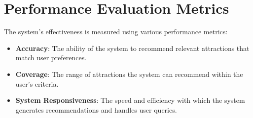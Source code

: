 \section{Performance Evaluation Metrics}
The system's effectiveness is measured using various performance metrics:
\begin{itemize}
    \item \textbf{Accuracy}: The ability of the system to recommend relevant attractions that match user preferences.
    \item \textbf{Coverage}: The range of attractions the system can recommend within the user’s criteria.
    \item \textbf{System Responsiveness}: The speed and efficiency with which the system generates recommendations and handles user queries.
\end{itemize}
